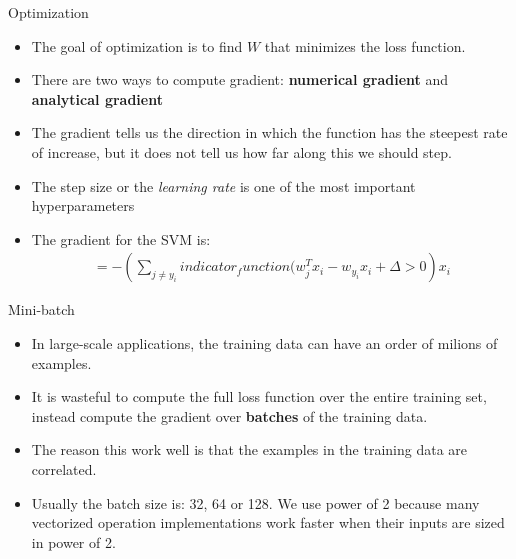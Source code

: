 \documentclass[10pt,mathserif]{beamer}
\begin{document}
\begin{frame}{Optimization}
\begin{itemize}
\item The goal of optimization is to find $W$ that minimizes the loss function.
\item There are two ways to compute gradient: \textbf{numerical gradient} and \textbf{analytical
gradient}
\item The gradient tells us the direction in which the function has the steepest rate of increase, but it does not tell us how far along this we should step.
\item The step size or the \textit{learning rate} is one of the most important hyperparameters
\item The gradient for the SVM is:
\begin{align}
=- \left(\sum_{j \neq y_i}indicator_function(w_j^Tx_i - w_{y_i}x_i + \Delta > 0\right) x_i
\end{align}
\end{itemize}
\end{frame}

\begin{frame}{Mini-batch}
\begin{itemize}
\item In large-scale applications, the training data can have an order of milions of examples.
\item It is wasteful to compute the full loss function over the entire training set, instead compute the gradient over \textbf{batches} of the training data.
\item The reason this work well is that the examples in the training data are correlated.
\item Usually the batch size is: 32, 64 or 128. We use power of 2 because many vectorized operation implementations work faster when their inputs are sized in power of 2. 
\end{itemize}
\end{frame}
\end{document}

